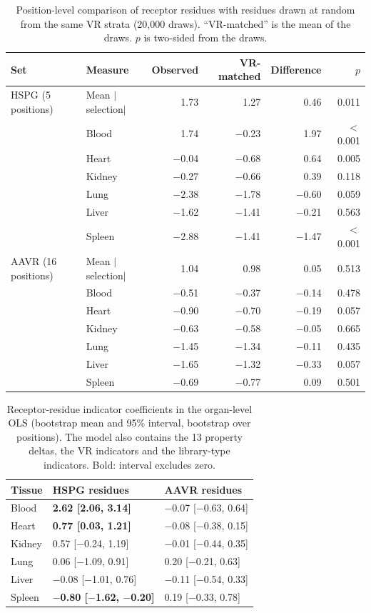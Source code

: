 \documentclass[11pt]{article}
\begin{document}
\begin{table}[H]
\centering
\caption{Position-level comparison of receptor residues with residues drawn at random from the
same VR strata (20,000 draws). ``VR-matched'' is the mean of the draws. $p$ is two-sided from the
draws.}
\label{tab:rperm}
\small
\begin{tabular}{llrrrr}
\toprule
Set & Measure & Observed & VR-matched & Difference & $p$ \\
\midrule
HSPG (5 positions) & Mean $|$selection$|$ & 1.73 & 1.27 & 0.46 & 0.011 \\
 & Blood & 1.74 & $-$0.23 & 1.97 & $<$0.001 \\
 & Heart & $-$0.04 & $-$0.68 & 0.64 & 0.005 \\
 & Kidney & $-$0.27 & $-$0.66 & 0.39 & 0.118 \\
 & Lung & $-$2.38 & $-$1.78 & $-$0.60 & 0.059 \\
 & Liver & $-$1.62 & $-$1.41 & $-$0.21 & 0.563 \\
 & Spleen & $-$2.88 & $-$1.41 & $-$1.47 & $<$0.001 \\
\midrule
AAVR (16 positions) & Mean $|$selection$|$ & 1.04 & 0.98 & 0.05 & 0.513 \\
 & Blood & $-$0.51 & $-$0.37 & $-$0.14 & 0.478 \\
 & Heart & $-$0.90 & $-$0.70 & $-$0.19 & 0.057 \\
 & Kidney & $-$0.63 & $-$0.58 & $-$0.05 & 0.665 \\
 & Lung & $-$1.45 & $-$1.34 & $-$0.11 & 0.435 \\
 & Liver & $-$1.65 & $-$1.32 & $-$0.33 & 0.057 \\
 & Spleen & $-$0.69 & $-$0.77 & 0.09 & 0.501 \\
\bottomrule
\end{tabular}
\end{table}

\begin{table}[H]
\centering
\caption{Receptor-residue indicator coefficients in the organ-level OLS (bootstrap mean and 95\%
interval, bootstrap over positions). The model also contains the 13 property deltas, the VR
indicators and the library-type indicators. Bold: interval excludes zero.}
\label{tab:rols}
\small
\begin{tabular}{lll}
\toprule
Tissue & HSPG residues & AAVR residues \\
\midrule
Blood & \textbf{2.62 [2.06, 3.14]} & $-$0.07 [$-$0.63, 0.64] \\
Heart & \textbf{0.77 [0.03, 1.21]} & $-$0.08 [$-$0.38, 0.15] \\
Kidney & 0.57 [$-$0.24, 1.19] & $-$0.01 [$-$0.44, 0.35] \\
Lung & 0.06 [$-$1.09, 0.91] & 0.20 [$-$0.21, 0.63] \\
Liver & $-$0.08 [$-$1.01, 0.76] & $-$0.11 [$-$0.54, 0.33] \\
Spleen & \textbf{$-$0.80 [$-$1.62, $-$0.20]} & 0.19 [$-$0.33, 0.78] \\
\bottomrule
\end{tabular}
\end{table}
\end{document}
